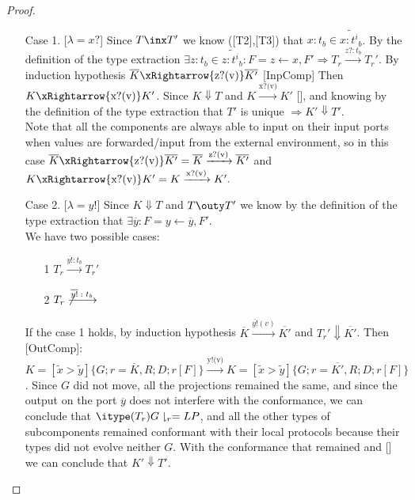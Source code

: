 \begin{proof}
\begin{itemize}
    \item [Case 1.][$\lambda=x?$] Since $T\inx T'$ we know ([T2],[T3]) that $x:t_b\in \widetilde{x:{t^i}_b}$. By the definition of the type extraction $\exists z:t_b\in \widetilde{z:{t^i}_b}: F=z \leftarrow x, F'\Rightarrow T_r\xrightarrow{\text{$z?:t_b$}} T_r'$. By induction hypothesis $\overline{K}\xRightarrow{\text{z?(v)}}\overline{K'}$
    [InpComp] Then $K\xRightarrow{\text{x?(v)}}K'$. Since $K\Downarrow T$ and $K\xrightarrow{\text{x?(v)}}K'$ [], and knowing by the definition of the type extraction that $T'$ is unique $\Rightarrow K'\Downarrow T'$.\\
    Note that all the components are always able to input on their input ports when values are forwarded/input from the external environment, so in this case  $\overline{K}\xRightarrow{\text{z?(v)}}\overline{K'}=\overline{K}\xrightarrow{\text{z?(v)}}\overline{K'}$ and $K\xRightarrow{\text{x?(v)}}K'= K\xrightarrow{\text{x?(v)}}K'.$
    
    
    
    
  
    
     \item [Case 2.][$\lambda=y!$] Since $K\Downarrow T$ and $T\outy T'$ we know by the definition of the type extraction that $\exists \overline{y}: F=y\leftarrow \overline{y},F'$. \\
     
     We have two possible cases:
     
     \begin{itemize}
         \item [1] $T_r\xrightarrow{\text{$\overline{y!}:t_b$}}T_r'$
         \item [2] $T_r\not \xrightarrow{\text{$\overline{y!}:t_b$}}$
     \end{itemize}
     
     If the case 1 holds, by induction hypothesis $\overline{K}\xrightarrow{\text{$\overline{y!}(v)$}}\overline{K'}$ and $T_r'\Downarrow \overline{K'}$. Then [OutComp]: $K=[\tilde{x}>\tilde{y}]\{G;r=\overline{K},R;D;r[F]\}\xrightarrow{\text{y!(v)}}K=[\tilde{x}>\tilde{y}]\{G;r=\overline{K'},R;D;r[F]\}$. Since $G$ did not move, all the projections remained the same, and since the output on the port $\overline{y}$ does not interfere with the conformance, we can conclude that $\itype(T_r)G\downharpoonright_r=LP$, and all the other types of subcomponents remained conformant with their local protocols because their types did not evolve neither $G$. With the conformance that remained and   [] we can conclude that $K'\Downarrow T'$.\\
     

\end{itemize}
\end{proof}
